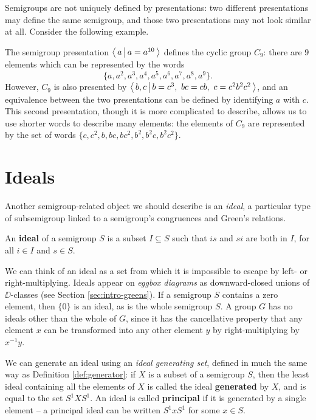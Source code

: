 Semigroups are not uniquely defined by presentations: two different
presentations may define the same semigroup, and those two presentations may not
look similar at all.  Consider the following example.

\begin{example}
  The semigroup presentation $\left\langle \, a \, \middle| \, a=a^{10} \, \right\rangle$ defines the cyclic group
  $C_9$: there are $9$ elements which can be represented by the words
  $$\{a, a^2, a^3, a^4, a^5, a^6, a^7, a^8, a^9\}.$$  However, $C_9$ is also
  presented by $\pres{b,c}{b=c^3,\ bc=cb,\ c=c^2b^2c^2}$, and an equivalence
  between the two presentations can be defined by identifying $a$ with $c$.
  This second presentation, though it is more complicated to describe, allows us
  to use shorter words to describe many elements: the elements of $C_9$ are
  represented by the set of words $\{c, c^2, b, bc, bc^2, b^2, b^2c, b^2c^2\}$.
\end{example}

\section{Ideals}
\label{sec:intro-ideals}

Another semigroup-related object we should describe is an \textit{ideal}, a
particular type of subsemigroup linked to a semigroup's congruences and Green's
relations.

\begin{definition}
  \label{def:ideal}
  An \textbf{ideal} of a semigroup $S$ is a subset $I \subseteq S$ such that
  $is$ and $si$ are both in $I$, for all $i \in I$ and $s \in S$.
\end{definition}

We can think of an ideal as a set from which it is impossible to escape by left-
or right-multiplying.  Ideals appear on \textit{eggbox diagrams} as
downward-closed unions of $\DD$-classes (see Section \ref{sec:intro-greens}).
If a semigroup $S$ contains a zero element, then $\{0\}$ is an ideal, as is the
whole semigroup $S$.  A group $G$ has no ideals other than the whole of $G$,
since it has the cancellative property that any element $x$ can be transformed
into any other element $y$ by right-multiplying by $x^{-1}y$.

We can generate an ideal using an \textit{ideal generating set}, defined in much
the same way as Definition \ref{def:generator}: if $X$ is a subset of a
semigroup $S$, then the least ideal containing all the elements of $X$ is called
the ideal \textbf{generated} by $X$, and is equal to the set $S^1XS^1$.  An
ideal is called \textbf{principal} if it is generated by a single element -- a
principal ideal can be written $S^1xS^1$ for some $x \in S$.

